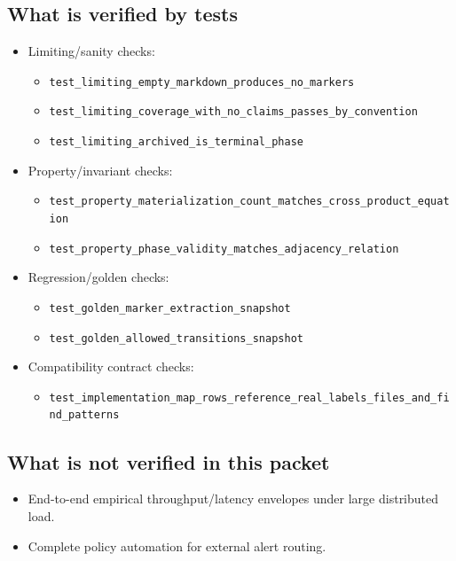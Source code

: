\documentclass[11pt]{article}
\begin{document}
\subsection*{What is verified by tests}
\begin{itemize}
  \item Limiting/sanity checks:
  \begin{itemize}
    \item \texttt{test\_limiting\_empty\_markdown\_produces\_no\_markers}
    \item \texttt{test\_limiting\_coverage\_with\_no\_claims\_passes\_by\_convention}
    \item \texttt{test\_limiting\_archived\_is\_terminal\_phase}
  \end{itemize}
  \item Property/invariant checks:
  \begin{itemize}
    \item \texttt{test\_property\_materialization\_count\_matches\_cross\_product\_equation}
    \item \texttt{test\_property\_phase\_validity\_matches\_adjacency\_relation}
  \end{itemize}
  \item Regression/golden checks:
  \begin{itemize}
    \item \texttt{test\_golden\_marker\_extraction\_snapshot}
    \item \texttt{test\_golden\_allowed\_transitions\_snapshot}
  \end{itemize}
  \item Compatibility contract checks:
  \begin{itemize}
    \item \texttt{test\_implementation\_map\_rows\_reference\_real\_labels\_files\_and\_find\_patterns}
  \end{itemize}
\end{itemize}

\subsection*{What is not verified in this packet}
\begin{itemize}
  \item End-to-end empirical throughput/latency envelopes under large distributed load.
  \item Complete policy automation for external alert routing.
\end{itemize}
\end{document}
